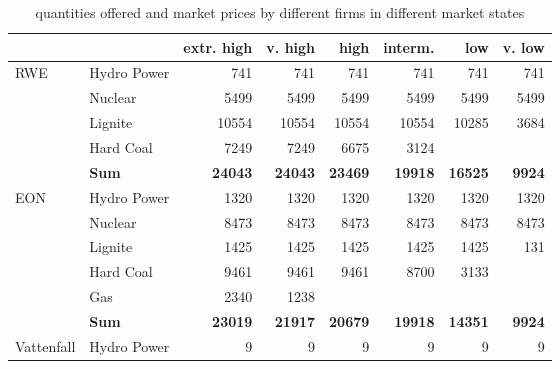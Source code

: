 
\begin{table}[htb]
\centering
\label{tab:statquant}
\caption{quantities offered and market prices by different firms in different market states}
\begin{tabular}{llrrrrrr}
\hline
\hline
           &            & extr. high &    v. high &       high &    interm. &        low &     v. low \\
\hline
       RWE & Hydro Power &        741 &        741 &        741 &        741 &        741 &        741 \\

           &    Nuclear &       5499 &       5499 &       5499 &       5499 &       5499 &       5499 \\

           &    Lignite &      10554 &      10554 &      10554 &      10554 &      10285 &       3684 \\

           &  Hard Coal &       7249 &       7249 &       6675 &       3124 &            &            \\

           &  {\bf Sum} & {\bf 24043} & {\bf 24043} & {\bf 23469} & {\bf 19918} & {\bf 16525} & {\bf 9924} \\
\hline
       EON & Hydro Power &       1320 &       1320 &       1320 &       1320 &       1320 &       1320 \\

           &    Nuclear &       8473 &       8473 &       8473 &       8473 &       8473 &       8473 \\

           &    Lignite &       1425 &       1425 &       1425 &       1425 &       1425 &        131 \\

           &  Hard Coal &       9461 &       9461 &       9461 &       8700 &       3133 &            \\

           &        Gas &       2340 &       1238 &            &            &            &            \\

           &  {\bf Sum} & {\bf 23019} & {\bf 21917} & {\bf 20679} & {\bf 19918} & {\bf 14351} & {\bf 9924} \\
\hline
Vattenfall & Hydro Power &          9 &          9 &          9 &          9 &          9 &          9 \\


\end{tabular}
\end{table}
